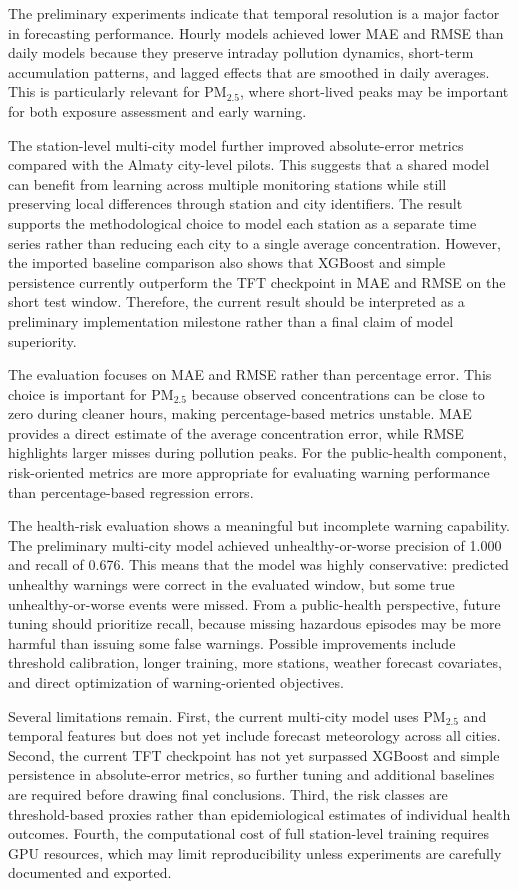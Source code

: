 \documentclass[pdflatex,sn-mathphys-num]{sn-jnl}
\begin{document}
The preliminary experiments indicate that temporal resolution is a major factor in forecasting performance. Hourly models achieved lower MAE and RMSE than daily models because they preserve intraday pollution dynamics, short-term accumulation patterns, and lagged effects that are smoothed in daily averages. This is particularly relevant for PM$_{2.5}$, where short-lived peaks may be important for both exposure assessment and early warning.

The station-level multi-city model further improved absolute-error metrics compared with the Almaty city-level pilots. This suggests that a shared model can benefit from learning across multiple monitoring stations while still preserving local differences through station and city identifiers. The result supports the methodological choice to model each station as a separate time series rather than reducing each city to a single average concentration. However, the imported baseline comparison also shows that XGBoost and simple persistence currently outperform the TFT checkpoint in MAE and RMSE on the short test window. Therefore, the current result should be interpreted as a preliminary implementation milestone rather than a final claim of model superiority.

The evaluation focuses on MAE and RMSE rather than percentage error. This choice is important for PM$_{2.5}$ because observed concentrations can be close to zero during cleaner hours, making percentage-based metrics unstable. MAE provides a direct estimate of the average concentration error, while RMSE highlights larger misses during pollution peaks. For the public-health component, risk-oriented metrics are more appropriate for evaluating warning performance than percentage-based regression errors.

The health-risk evaluation shows a meaningful but incomplete warning capability. The preliminary multi-city model achieved unhealthy-or-worse precision of 1.000 and recall of 0.676. This means that the model was highly conservative: predicted unhealthy warnings were correct in the evaluated window, but some true unhealthy-or-worse events were missed. From a public-health perspective, future tuning should prioritize recall, because missing hazardous episodes may be more harmful than issuing some false warnings. Possible improvements include threshold calibration, longer training, more stations, weather forecast covariates, and direct optimization of warning-oriented objectives.

Several limitations remain. First, the current multi-city model uses PM$_{2.5}$ and temporal features but does not yet include forecast meteorology across all cities. Second, the current TFT checkpoint has not yet surpassed XGBoost and simple persistence in absolute-error metrics, so further tuning and additional baselines are required before drawing final conclusions. Third, the risk classes are threshold-based proxies rather than epidemiological estimates of individual health outcomes. Fourth, the computational cost of full station-level training requires GPU resources, which may limit reproducibility unless experiments are carefully documented and exported.
\end{document}
